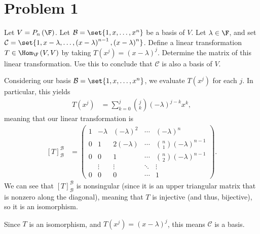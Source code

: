\documentclass[10pt]{mypackage}
\begin{document}
\section{Problem 1}%
\begin{problem}
  Let $V = P_{n}\left(\F\right)$. Let $\mathcal{B} = \set{1,x,\dots,x^n}$ be a basis of $V$. Let $\lambda \in \F$, and set $\mathcal{C} = \set{1,x-\lambda,\dots,\left(x-\lambda\right)^{n-1},\left(x-\lambda\right)^n}$. Define a linear transformation $T\in \Hom_{\F}\left(V,V\right)$ by taking $T\left(x^j\right) = \left(x-\lambda\right)^j$. Determine the matrix of this linear transformation. Use this to conclude that $\mathcal{C}$ is also a basis of $V$.
\end{problem}
\begin{solution}
  Considering our basis $\mathcal{B} = \set{1,x,\dots,x^n}$, we evaluate $T\left(x^j\right)$ for each $j$. In particular, this yields
  \begin{align*}
    T\left(x^j\right) &= \sum_{k=0}^{j}{j\choose k}\left(-\lambda\right)^{j-k}x^k,
  \end{align*}
  meaning that our linear transformation is
  \begin{align*}
    \left[T\right]_{\mathcal{B}}^{\mathcal{B}} &= \begin{pmatrix}1 & -\lambda & \left(-\lambda\right)^2 & \cdots & \left(-\lambda\right)^{n}\\ 0 & 1 & 2\left(-\lambda\right) & \cdots & {n\choose 1}\left(-\lambda\right)^{n-1}\\ 0 & 0 & 1 & \cdots & {n\choose 2}\left(-\lambda\right)^{n-1} \\ &\vdots & \vdots & \ddots & \vdots \\ 0 & 0 & 0 & \cdots & 1\end{pmatrix}.
  \end{align*}
  We can see that $\left[T\right]_{\mathcal{B}}^{\mathcal{B}}$ is nonsingular (since it is an upper triangular matrix that is nonzero along the diagonal), meaning that $T$ is injective (and thus, bijective), so it is an isomorphism.\newline

  Since $T$ is an isomorphism, and $T\left(x^j\right) = \left(x-\lambda\right)^j$, this means $\mathcal{C}$ is a basis.
\end{solution}
\end{document}
